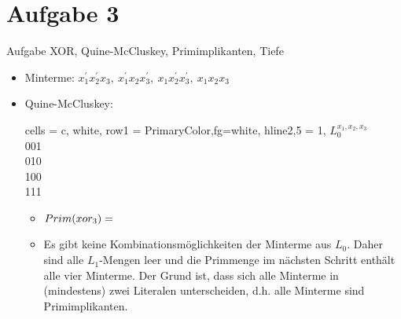 
\section{Aufgabe 3}

\setcounter{exercise}{1}

\begin{frame}[allowframebreaks]{Aufgabe \thesection}{XOR, Quine-McCluskey, Primimplikanten, Tiefe}
  \begin{solutionnoinc}
    \begin{itemize}
      \item \alert{Minterme:} $x_{1}^{\prime}x_{2}^{\prime}x_{3},\ x_{1}^{\prime}x_{2}x_{3}^{\prime},\ x_{1}x_{2}^{\prime}x_{3}^{\prime},\ x_{1}x_{2}x_{3}$
      \item \alert{Quine-McCluskey:}
        \begin{table}
        \centering
        \begin{tblr}{
          cells = {c, white},
          row{1} = {PrimaryColor,fg=white},
          hline{2,5} = {1}{},
        }
        $L_{0}^{x_1, x_2, x_3}$ \\
        001                     \\
        010                     \\
        100                     \\
        111                     
        \end{tblr}
        \end{table}
        \begin{itemize}
          \item $Prim(xor_3) = \empty$
          \item Es gibt keine Kombinationsmöglichkeiten der Minterme aus $L_0$. Daher sind alle $L_1$-Mengen leer und die Primmenge im nächsten Schritt enthält alle vier Minterme. Der Grund ist, dass sich alle Minterme in (mindestens) zwei Literalen unterscheiden, d.h. alle Minterme sind Primimplikanten.
        \end{itemize}
    \end{itemize}
  \end{solutionnoinc}
  \begin{solution}
    \begin{table}
      \centering
      \begin{tblr}{
}
\end{tblr}
\end{table}
\end{solution}
\end{frame}
